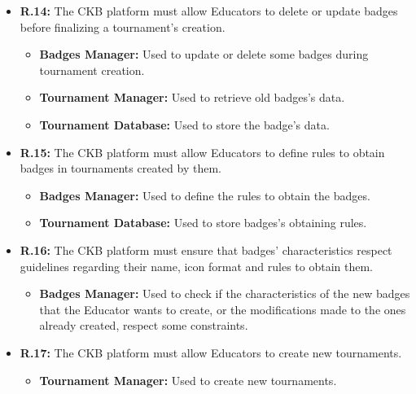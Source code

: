 \documentclass{article}
\begin{document}
{\begin{itemize}
\begin{itemize}
\begin{itemize}
              work.
              \item \textbf{Account Manager:} Used to retrieve Educator's data.
              \item \textbf{Tournament Database:} Used to store battle and scores' data. The scores are both the automatically generated ones and the ones
              given by the Educator through the manual evaluation process.  
          \end{itemize}
    \item \textbf{R.14:} The CKB platform must allow Educators to delete or update badges before finalizing a tournament's creation.
          \begin{itemize}
              \item \textbf{Badges Manager:} Used to update or delete some badges during tournament creation.
              \item \textbf{Tournament Manager:} Used to retrieve old badges's data.
              \item \textbf{Tournament Database:}  Used to store the badge's data.
          \end{itemize}
    \item \textbf{R.15:} The CKB platform must allow Educators to define rules to obtain badges in tournaments created by them.
          \begin{itemize}
              \item \textbf{Badges Manager:} Used to define the rules to obtain the badges.
              \item \textbf{Tournament Database:} Used to store badges's obtaining rules.
          \end{itemize}
    \item \textbf{R.16:} The CKB platform must ensure that badges' characteristics respect guidelines regarding their
          name, icon format and rules to obtain them.
          \begin{itemize}
              \item \textbf{Badges Manager:} Used to check if the characteristics of the new badges
              that the Educator wants to create, or the modifications made to the ones already 
              created, respect some constraints.
          \end{itemize}
    \item \textbf{R.17:} The CKB platform must allow Educators to create new tournaments.
          \begin{itemize}
              \item \textbf{Tournament Manager:} Used to create new tournaments.

\end{itemize}
\end{itemize}
\end{itemize}}
\end{document}
